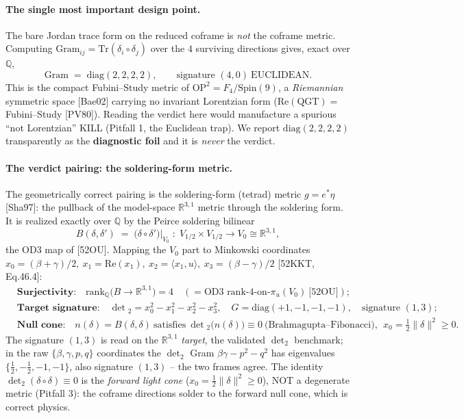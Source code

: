 \paragraph{The single most important design point.} The bare Jordan trace form on
the reduced coframe is \emph{not} the coframe metric. Computing
$\mathrm{Gram}_{ij}=\mathrm{Tr}(\delta_i\circ\delta_j)$ over the $4$ surviving
directions gives, exact over $\mathbb{Q}$,
\begin{equation}
  \mathrm{Gram} \;=\; \mathrm{diag}(2,2,2,2), \qquad
  \text{signature } (4,0)\ \text{EUCLIDEAN}.
\end{equation}
This is the compact Fubini--Study metric of $\mathrm{OP}^2=F_4/\mathrm{Spin}(9)$, a
\emph{Riemannian} symmetric space [Bae02] carrying no invariant Lorentzian form
($\mathrm{Re}(\mathrm{QGT})=$ Fubini--Study [PV80]). Reading the verdict here would
manufacture a spurious ``not Lorentzian'' KILL (Pitfall 1, the Euclidean trap). We
report $\mathrm{diag}(2,2,2,2)$ transparently as the \textbf{diagnostic foil} and it
is \emph{never} the verdict.

\paragraph{The verdict pairing: the soldering-form metric.} The geometrically correct
pairing is the soldering-form (tetrad) metric $g=e^{*}\eta$ [Sha97]: the pullback of
the model-space $\mathbb{R}^{3,1}$ metric through the soldering form. It is realized
exactly over $\mathbb{Q}$ by the Peirce soldering bilinear
\begin{equation}
  B(\delta,\delta') \;=\; \big(\delta\circ\delta'\big)\big|_{V_0}
  \;:\; V_{1/2}\times V_{1/2} \longrightarrow V_0\cong\mathbb{R}^{3,1},
\end{equation}
the OD3 map of [52OU]. Mapping the $V_0$ part to Minkowski coordinates
$x_0=(\beta+\gamma)/2,\ x_1=\mathrm{Re}(x_1),\ x_2=\langle x_1,u\rangle,\
x_3=(\beta-\gamma)/2$ [52KKT, Eq.46.4]:
\begin{align}
  &\textbf{Surjectivity:}\quad
    \mathrm{rank}_{\mathbb{Q}}\big(B \to \mathbb{R}^{3,1}\big) = 4
    \quad (= \text{OD3 rank-}4\text{-on-}\pi_u(V_0)\ \text{[52OU]}); \\[2pt]
  &\textbf{Target signature:}\quad
    \det{}_2 = x_0^2 - x_1^2 - x_2^2 - x_3^2,\quad G=\mathrm{diag}(+1,-1,-1,-1),
    \quad \text{signature } \boxed{(1,3)}; \\[2pt]
  &\textbf{Null cone:}\quad
    n(\delta)=B(\delta,\delta)\ \text{satisfies}\ \det{}_2\big(n(\delta)\big)\equiv 0
    \ \text{(Brahmagupta--Fibonacci)},\ \ x_0=\tfrac12\|\delta\|^2\ge 0.
\end{align}
The signature $(1,3)$ is read on the $\mathbb{R}^{3,1}$ \emph{target}, the validated
$\det_2$ benchmark; in the raw $\{\beta,\gamma,p,q\}$ coordinates the $\det_2$ Gram
$\beta\gamma-p^2-q^2$ has eigenvalues $\{\tfrac12,-\tfrac12,-1,-1\}$, also signature
$(1,3)$ -- the two frames agree. The identity $\det_2(\delta\circ\delta)\equiv 0$ is
the \emph{forward light cone} ($x_0=\tfrac12\|\delta\|^2\ge 0$), NOT a degenerate
metric (Pitfall 3): the coframe directions solder to the forward null cone, which is
correct physics.

